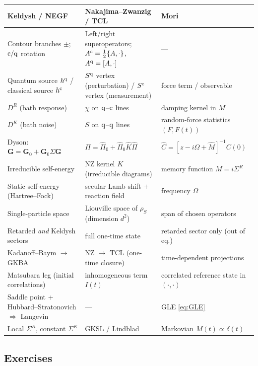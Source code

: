 \begin{center}
\small
\renewcommand{\arraystretch}{1.25}
\begin{tabularx}{\textwidth}{>{\raggedright\arraybackslash}X>{\raggedright\arraybackslash}X>{\raggedright\arraybackslash}X}
\toprule
\textbf{Keldysh / NEGF} & \textbf{Nakajima--Zwanzig / TCL} & \textbf{Mori} \\
\midrule
Contour branches $\pm$; $\mathrm{c}/\mathrm{q}$ rotation & Left/right superoperators; $A^{\mathrm{c}}=\frac12\{A,\cdot\}$, $A^{\mathrm{q}}=[A,\cdot]$ & --- \\
Quantum source $h^{\mathrm{q}}$ / classical source $h^{\mathrm{c}}$ & $S^{\mathrm{q}}$ vertex (perturbation) / $S^{\mathrm{c}}$ vertex (measurement) & force term / observable \\
$D^R$ (bath response) & $\chi$ on $\mathrm{q}$--$\mathrm{c}$ lines & damping kernel in $M$ \\
$D^K$ (bath noise) & $S$ on $\mathrm{q}$--$\mathrm{q}$ lines & random-force statistics $(F,F(t))$ \\
Dyson: $\mathbf G=\mathbf G_0+\mathbf G_0\Sigma\mathbf G$ & $\hat\Pi=\hat\Pi_0+\hat\Pi_0\hat K\hat\Pi$ & $\hat C=[z-i\Omega+\hat M]^{-1}C(0)$ \\
Irreducible self-energy & NZ kernel $K$ (irreducible diagrams) & memory function $M=i\Sigma^R$ \\
Static self-energy (Hartree--Fock) & secular Lamb shift $+$ reaction field & frequency $\Omega$ \\
Single-particle space & Liouville space of $\rho_S$ (dimension $d^2$) & span of chosen operators \\
Retarded \emph{and} Keldysh sectors & full one-time state & retarded sector only (out of eq.) \\
Kadanoff--Baym $\to$ GKBA & NZ $\to$ TCL (one-time closure) & time-dependent projections \\
Matsubara leg (initial correlations) & inhomogeneous term $I(t)$ & correlated reference state in $(\cdot,\cdot)$ \\
Saddle point + Hubbard--Stratonovich $\Rightarrow$ Langevin & --- & GLE \eqref{eq:GLE} \\
Local $\Sigma^R$, constant $\Sigma^K$ & GKSL / Lindblad & Markovian $M(t)\propto\delta(t)$ \\
\bottomrule
\end{tabularx}
\end{center}

\subsection{Exercises}

